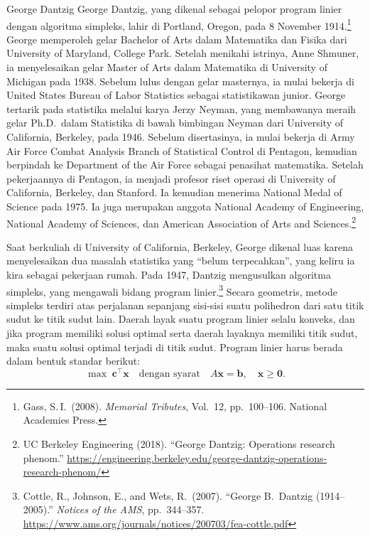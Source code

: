 \begin{pioneerspotlight}{George Dantzig}
George Dantzig, yang dikenal sebagai pelopor program linier dengan algoritma simpleks, lahir di Portland, Oregon, pada 8 November 1914.\footnote{Gass, S.\,I.\ (2008). \emph{Memorial Tributes}, Vol.~12, pp.~100--106. National Academies Press.}
George memperoleh gelar Bachelor of Arts dalam Matematika dan Fisika dari University of Maryland, College Park. Setelah menikahi istrinya, Anne Shmuner, ia menyelesaikan gelar Master of Arts dalam Matematika di University of Michigan pada 1938. Sebelum lulus dengan gelar masternya, ia mulai bekerja di United States Bureau of Labor Statistics sebagai statistikawan junior. George tertarik pada statistika melalui karya Jerzy Neyman, yang membawanya meraih gelar Ph.D.\ dalam Statistika di bawah bimbingan Neyman dari University of California, Berkeley, pada 1946. Sebelum disertasinya, ia mulai bekerja di Army Air Force Combat Analysis Branch of Statistical Control di Pentagon, kemudian berpindah ke Department of the Air Force sebagai penasihat matematika. Setelah pekerjaannya di Pentagon, ia menjadi profesor riset operasi di University of California, Berkeley, dan Stanford. Ia kemudian menerima National Medal of Science pada 1975. Ia juga merupakan anggota National Academy of Engineering, National Academy of Sciences, dan American Association of Arts and Sciences.\footnote{UC Berkeley Engineering (2018). ``George Dantzig: Operations research phenom.'' \url{https://engineering.berkeley.edu/george-dantzig-operations-research-phenom/}}

Saat berkuliah di University of California, Berkeley, George dikenal luas karena menyelesaikan dua masalah statistika yang ``belum terpecahkan'', yang keliru ia kira sebagai pekerjaan rumah. Pada 1947, Dantzig mengusulkan algoritma simpleks, yang mengawali bidang program linier.\footnote{Cottle, R., Johnson, E., and Wets, R.\ (2007). ``George B.\ Dantzig (1914--2005).'' \emph{Notices of the AMS}, pp.~344--357. \url{https://www.ams.org/journals/notices/200703/fea-cottle.pdf}}
Secara geometris, metode simpleks terdiri atas perjalanan sepanjang sisi-sisi suatu polihedron dari satu titik sudut ke titik sudut lain. Daerah layak suatu program linier selalu konveks, dan jika program memiliki solusi optimal serta daerah layaknya memiliki titik sudut, maka suatu solusi optimal terjadi di titik sudut. Program linier harus berada dalam bentuk standar berikut:
\[
\max \; \mathbf{c}^\top \mathbf{x} \quad \text{dengan syarat} \quad A \mathbf{x} = \mathbf{b}, \quad \mathbf{x} \geq \mathbf{0}.
\]


\end{pioneerspotlight}
